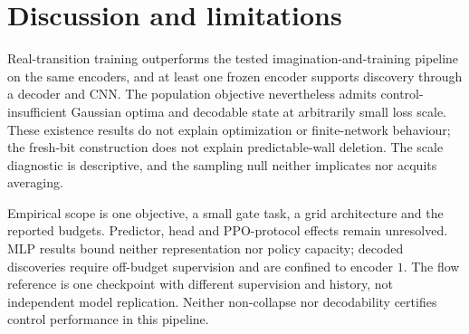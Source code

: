 \section{Discussion and limitations}
\label{sec:limitations}

Real-transition training outperforms the tested imagination-and-training pipeline on the same
encoders, and at least one frozen encoder supports discovery through a decoder and CNN.
The population objective nevertheless admits control-insufficient Gaussian optima and decodable
state at arbitrarily small loss scale. These existence results do not explain optimization or
finite-network behaviour; the fresh-bit construction does not explain predictable-wall deletion.
The scale diagnostic is descriptive, and the sampling null neither implicates nor acquits averaging.

Empirical scope is one objective, a small gate task, a grid architecture and the reported budgets.
Predictor, head and PPO-protocol effects remain unresolved. MLP results bound neither representation
nor policy capacity; decoded discoveries require off-budget supervision and are confined to encoder
$1$. The flow reference is one checkpoint with different supervision and history, not independent
model replication. Neither non-collapse nor decodability certifies control performance in this pipeline.
